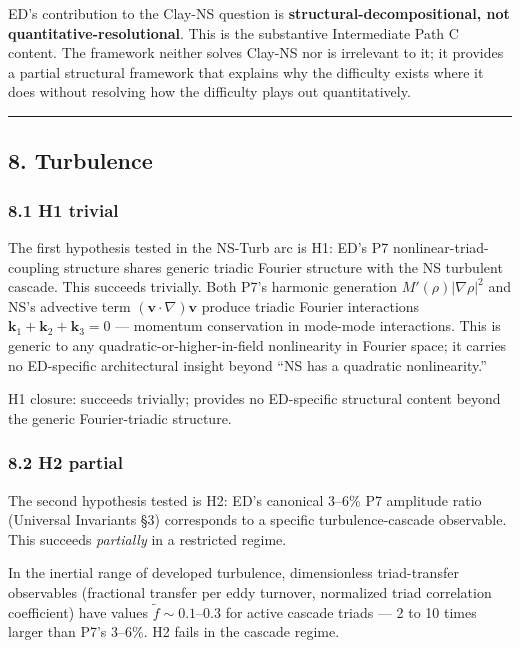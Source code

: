 \documentclass[
]{article}
\begin{document}
ED's contribution to the Clay-NS question is
\textbf{structural-decompositional, not quantitative-resolutional}. This
is the substantive Intermediate Path C content. The framework neither
solves Clay-NS nor is irrelevant to it; it provides a partial structural
framework that explains why the difficulty exists where it does without
resolving how the difficulty plays out quantitatively.

\begin{center}\rule{0.5\linewidth}{0.5pt}\end{center}

\subsection{8. Turbulence}\label{turbulence}

\subsubsection{8.1 H1 trivial}\label{h1-trivial}

The first hypothesis tested in the NS-Turb arc is H1: ED's P7
nonlinear-triad-coupling structure shares generic triadic Fourier
structure with the NS turbulent cascade. This succeeds trivially. Both
P7's harmonic generation \(M'(\rho)|\nabla\rho|^2\) and NS's advective
term \((\mathbf{v} \cdot \nabla)\mathbf{v}\) produce triadic Fourier
interactions \(\mathbf{k}_1 + \mathbf{k}_2 + \mathbf{k}_3 = 0\) ---
momentum conservation in mode-mode interactions. This is generic to any
quadratic-or-higher-in-field nonlinearity in Fourier space; it carries
no ED-specific architectural insight beyond ``NS has a quadratic
nonlinearity.''

H1 closure: succeeds trivially; provides no ED-specific structural
content beyond the generic Fourier-triadic structure.

\subsubsection{8.2 H2 partial}\label{h2-partial}

The second hypothesis tested is H2: ED's canonical 3--6\% P7 amplitude
ratio (Universal Invariants §3) corresponds to a specific
turbulence-cascade observable. This succeeds \emph{partially} in a
restricted regime.

In the inertial range of developed turbulence, dimensionless
triad-transfer observables (fractional transfer per eddy turnover,
normalized triad correlation coefficient) have values
\(\tilde f \sim 0.1\)--\(0.3\) for active cascade triads --- 2 to 10
times larger than P7's 3--6\%. H2 fails in the cascade regime.
\end{document}

